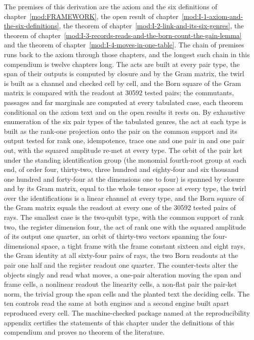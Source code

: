 \begin{chproof}[census]
The premises of this derivation are the axiom and the six definitions of chapter~\ref{mod:FRAMEWORK}, the open result of chapter~\ref{mod:I-1-axiom-and-the-six-definitions}, the theorem of chapter~\ref{mod:I-2-link-and-its-six-genres}, the theorem of chapter~\ref{mod:I-3-records-reads-and-the-born-count-the-gain-lemma} and the theorem of chapter~\ref{mod:I-4-moves-in-one-table}. The chain of premises runs back to the axiom through those chapters, and the longest such chain in this compendium is twelve chapters long.
The acts are built at every pair type, the span of their outputs is computed by closure and by the Gram matrix, the twirl is built as a channel and checked cell by cell, and the Born square of the Gram matrix is compared with the readout at 30592 tested pairs; the commutants, passages and far marginals are computed at every tabulated case, each theorem conditional on the axiom text and on the open results it rests on.
By exhaustive enumeration of the six pair types of the tabulated genres, the act at each type is built as the rank-one projection onto the pair on the common support and its output tested for rank one, idempotence, trace one and one pair in and one pair out, with the squared amplitude re-met at every type. The orbit of the pair ket under the standing identification group (the monomial fourth-root group at each end, of order four, thirty-two, three hundred and eighty-four and six thousand one hundred and forty-four at the dimensions one to four) is spanned by closure and by its Gram matrix, equal to the whole tensor space at every type, the twirl over the identifications is a linear channel at every type, and the Born square of the Gram matrix equals the readout at every one of the 30592 tested pairs of rays. The smallest case is the two-qubit type, with the common support of rank two, the register dimension four, the act of rank one with the squared amplitude of its output one quarter, an orbit of thirty-two vectors spanning the four-dimensional space, a tight frame with the frame constant sixteen and eight rays, the Gram identity at all sixty-four pairs of rays, the two Born readouts at the pair one half and the register readout one quarter.
The counter-tests alter the objects singly and read what moves, a one-pair alteration moving the span and frame cells, a nonlinear readout the linearity cells, a non-flat pair the pair-ket norm, the trivial group the span cells and the planted text the deciding cells. The ten controls read the same at both engines and a second engine built apart reproduced every cell.
The machine-checked package named at the reproducibility appendix certifies the statements of this chapter under the definitions of this compendium and proves no theorem of the literature.
\end{chproof}
